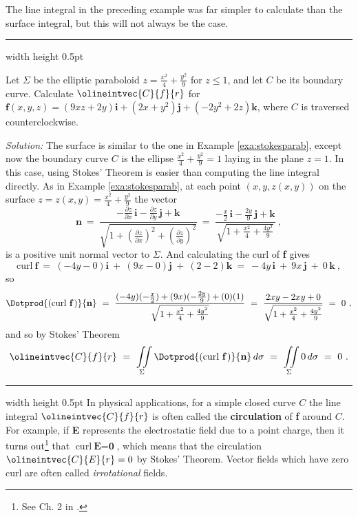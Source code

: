 The line integral in the preceding example was far simpler to calculate than the surface integral, but this will not
always be the case.

\vspace{3mm}
\hrule width \textwidth height 0.5pt
\begin{exa}
 Let $\Sigma$ be the elliptic paraboloid $z=\frac{x^2}{4}+\frac{y^2}{9}$ for $z \le 1$, and let $C$ be its boundary
 curve.
 Calculate $\olineintvec{C}{f}{r}$ for $\textbf{f}(x,y,z)=(9xz+2y)\textbf{i}+(2x+y^2 )\textbf{j}+(-2y^2 +2z)\textbf{k}$,
 where $C$ is traversed counterclockwise.\vspace{1mm}
 \par\noindent\emph{Solution:} The surface is similar to the one in Example \ref{exa:stokesparab}, except now the
 boundary curve $C$ is the ellipse $\frac{x^2}{4}+\frac{y^2}{9}=1$ laying in the plane $z=1$. In this case, using
 Stokes' Theorem is easier than computing the line integral directly. As in Example \ref{exa:stokesparab}, at each
 point $(x,y,z(x,y))$ on the surface $z=z(x,y)=\frac{x^2}{4}+\frac{y^2}{9}$ the vector
 \begin{displaymath}
  \textbf{n} ~=~
   \frac{-\frac{\partial z}{\partial x}\,\textbf{i} - \frac{\partial z}{\partial y}\,\textbf{j} +
   \textbf{k}}{\sqrt{1 + \left( \tfrac{\partial z}{\partial x} \right)^2 +
   \left( \tfrac{\partial z}{\partial y} \right)^2}} ~=~
   \frac{-\tfrac{x}{2}\,\textbf{i} - \tfrac{2y}{9}\,\textbf{j} + \textbf{k}}{\sqrt{1 +\tfrac{x^2}{4}+
    \tfrac{4y^2}{9}}} ~,
 \end{displaymath}
 is a positive unit normal vector to $\Sigma$. And calculating the curl of \textbf{f} gives
 \begin{displaymath}
  \text{curl}~\textbf{f} ~=~ (-4y-0)\textbf{i} ~+~ (9x-0)\textbf{j} ~+~ (2-2)\textbf{k} ~=~ -4y\,\textbf{i} ~+~ 9x\,\textbf{j} ~+~
   0\,\textbf{k}~,
 \end{displaymath}
 so
 \begin{displaymath}
  \Dotprod{(\text{curl}~{\textbf{f}}\,)}{\textbf{n}} ~=~ \frac{(-4y)(-\tfrac{x}{2})+(9x)(-\tfrac{2y}{9})+
   (0)(1)}{\sqrt{1 +\tfrac{x^2}{4}+\tfrac{4y^2}{9}}} ~=~ \frac{2xy-2xy+0}{\sqrt{1 +\tfrac{x^2}{4}+\tfrac{4y^2}{9}}} ~=~ 0~,
 \end{displaymath}
 and so by Stokes' Theorem
 \begin{displaymath}
  \olineintvec{C}{f}{r} ~=~ \iint\limits_{\Sigma} \Dotprod{(\text{curl}~{\textbf{f}}\,)}{\textbf{n}}\,d\sigma ~=~
   \iint\limits_{\Sigma} 0\,d\sigma ~=~ 0 ~.
 \end{displaymath}
\end{exa}
\hrule width \textwidth height 0.5pt
   In physical applications, for a simple closed curve $C$ the line integral $\olineintvec{C}{f}{r}$
is often called the \textbf{circulation} of \textbf{f} around $C$. For example, if \textbf{E}
represents the electrostatic field due to a point charge, then
it turns out\footnote{See Ch. 2 in \cite{rmc}.} that $\text{curl}~\textbf{E} = \textbf{0}$, which means that the
circulation $\olineintvec{C}{E}{r}=0$ by Stokes' Theorem. Vector fields which have zero curl are often called
\emph{irrotational} fields.

